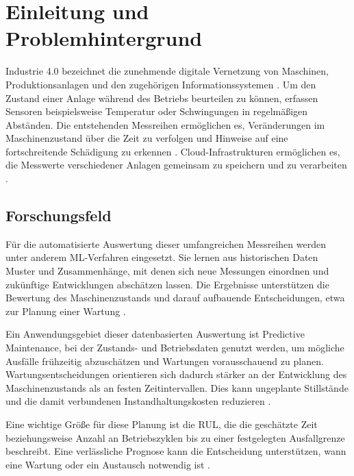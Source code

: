 

\chapter{Einleitung und Problemhintergrund}\label{cha:introduction}

Industrie 4.0 bezeichnet die zunehmende digitale Vernetzung von Maschinen, Produktionsanlagen und den zugehörigen Informationssystemen \parencite[1--2]{zontaPredictiveMaintenanceIndustry2020}. Um den Zustand einer Anlage während des Betriebs beurteilen zu können, erfassen Sensoren beispielsweise Temperatur oder Schwingungen in regelmäßigen Abständen. Die entstehenden Messreihen ermöglichen es, Veränderungen im Maschinenzustand über die Zeit zu verfolgen und Hinweise auf eine fortschreitende Schädigung zu erkennen \parencite[1, 4]{berghoutSystematicGuidePredicting2022}. Cloud-Infrastrukturen ermöglichen es, die Messwerte verschiedener Anlagen gemeinsam zu speichern und zu verarbeiten \parencite[1--2]{zontaPredictiveMaintenanceIndustry2020}.

\section{Forschungsfeld}

Für die automatisierte Auswertung dieser umfangreichen Messreihen werden unter anderem \ac{ML}-Verfahren eingesetzt. Sie lernen aus historischen Daten Muster und Zusammenhänge, mit denen sich neue Messungen einordnen und zukünftige Entwicklungen abschätzen lassen. Die Ergebnisse unterstützen die Bewertung des Maschinenzustands und darauf aufbauende Entscheidungen, etwa zur Planung einer Wartung \parencite[1, 4]{berghoutSystematicGuidePredicting2022}.

Ein Anwendungsgebiet dieser datenbasierten Auswertung ist Predictive Maintenance, bei der Zustands- und Betriebsdaten genutzt werden, um mögliche Ausfälle frühzeitig abzuschätzen und Wartungen vorausschauend zu planen. Wartungsentscheidungen orientieren sich dadurch stärker an der Entwicklung des Maschinenzustands als an festen Zeitintervallen. Dies kann ungeplante Stillstände und die damit verbundenen Instandhaltungskosten reduzieren \parencite[1--2, 7]{zontaPredictiveMaintenanceIndustry2020}.

Eine wichtige Größe für diese Planung ist die \ac{RUL}, die die geschätzte Zeit beziehungsweise Anzahl an Betriebszyklen bis zu einer festgelegten Ausfallgrenze beschreibt. Eine verlässliche Prognose kann die Entscheidung unterstützen, wann eine Wartung oder ein Austausch notwendig ist \parencite[2]{huRemainingUsefulLife2019}.

